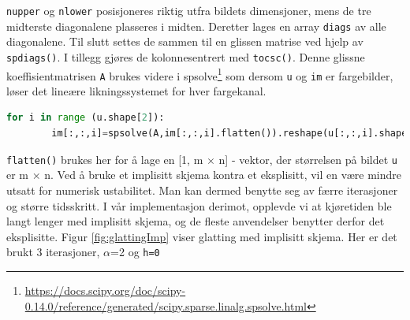 \texttt{nupper} og \texttt{nlower} posisjoneres riktig utfra bildets dimensjoner, mens de tre midterste diagonalene plasseres i midten. Deretter lages en array \texttt{diags} av alle diagonalene. Til slutt settes de sammen til en glissen matrise ved hjelp av \texttt{spdiags()}. I tillegg gjøres de kolonnesentrert med \texttt{tocsc()}.
Denne glissne koeffisientmatrisen \texttt{A} brukes videre i spsolve\footnote{\url{https://docs.scipy.org/doc/scipy-0.14.0/reference/generated/scipy.sparse.linalg.spsolve.html}} som dersom \texttt{u} og \texttt{im} er fargebilder, løser det lineære likningssystemet for hver fargekanal.
\begin{lstlisting}[language=Python]
    for i in range (u.shape[2]):
        im[:,:,i]=spsolve(A,im[:,:,i].flatten()).reshape(u[:,:,i].shape)
\end{lstlisting}
\texttt{flatten()} brukes her for å lage en [1, m $\times$ n] - vektor, der størrelsen på bildet \texttt{u} er m $\times$ n. Ved å bruke et implisitt skjema kontra et eksplisitt, vil en være mindre utsatt for numerisk ustabilitet. Man kan dermed benytte seg av færre iterasjoner og større tidsskritt. I vår implementasjon derimot, opplevde vi at kjøretiden ble langt lenger med implisitt skjema, og de fleste anvendelser benytter derfor det eksplisitte. Figur \ref{fig:glattingImp} viser glatting med implisitt skjema. Her er det brukt 3 iterasjoner, $\alpha$=2 og \texttt{h=0}